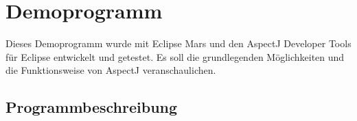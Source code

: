 \chapter{Demoprogramm}
\label{chap:demoprogramm}
Dieses Demoprogramm wurde mit Eclipse Mars und den AspectJ Developer Tools f\"{u}r Eclipse entwickelt und getestet. Es soll die grundlegenden M\"{o}glichkeiten und die Funktionsweise von AspectJ veranschaulichen.
\section{Programmbeschreibung}
\label{demo_beschreibung}